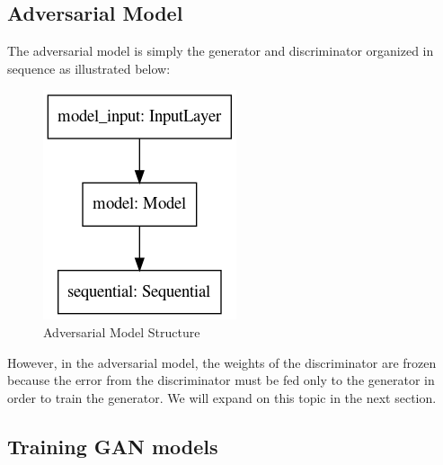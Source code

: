 \documentclass[12pt,oneside]{chicagocapstone}
\begin{document}
\hypertarget{adversarial-model}{%
\subsection*{Adversarial Model}\label{adversarial-model}}

The adversarial model is simply the generator and discriminator organized in sequence as illustrated below:
\begin{figure}

{\centering \includegraphics[width=0.3\linewidth]{figure/gan_model} 

}

\caption{Adversarial Model Structure}\label{fig:unnamed-chunk-7}
\end{figure}
However, in the adversarial model, the weights of the discriminator are frozen because the error from the discriminator must be fed only to the generator in order to train the generator. We will expand on this topic in the next section.

\hypertarget{training-gan-models}{%
\subsection*{Training GAN models}\label{training-gan-models}}
\end{document}
